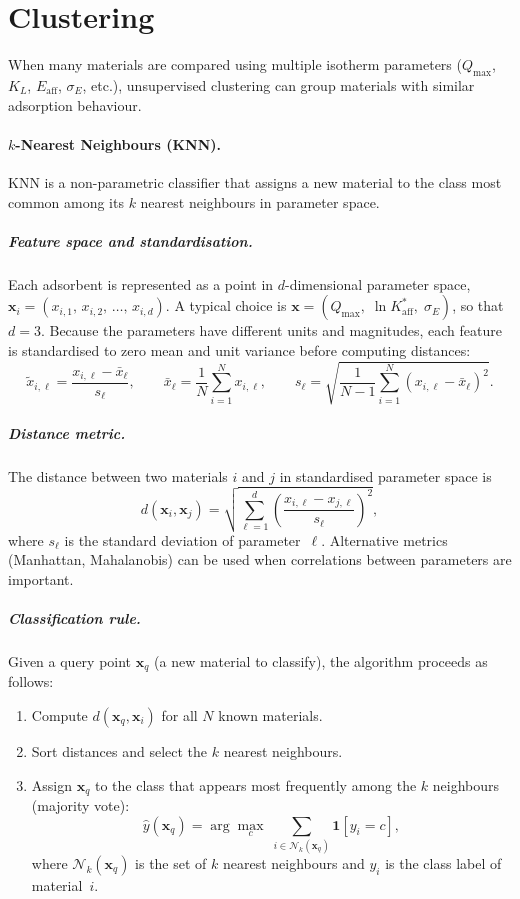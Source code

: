 \documentclass[12pt]{article}
\begin{document}
	\section{Clustering}

	When many materials are compared using multiple isotherm parameters
	($Q_{\max}$, $K_L$, $E_{\mathrm{aff}}$, $\sigma_E$, etc.),
	unsupervised clustering can group materials with similar adsorption
	behaviour.

	\paragraph{$k$-Nearest Neighbours (KNN).}
	KNN is a non-parametric classifier that assigns a new material to
	the class most common among its $k$ nearest neighbours in
	parameter space.

	\subparagraph{Feature space and standardisation.}
	Each adsorbent is represented as a point in $d$-dimensional
	parameter space,
	$\mathbf{x}_i = (x_{i,1},\, x_{i,2},\, \ldots,\, x_{i,d})$.
	A typical choice is
	$\mathbf{x} = (Q_{\max},\; \ln K_{\mathrm{aff}}^{\ast},\;
	\sigma_E)$, so that $d = 3$.
	Because the parameters have different units and magnitudes,
	each feature is standardised to zero mean and unit variance
	before computing distances:
	\begin{equation}
		\tilde{x}_{i,\ell}
		= \frac{x_{i,\ell} - \bar{x}_\ell}{s_\ell},
		\qquad
		\bar{x}_\ell = \frac{1}{N}\sum_{i=1}^{N} x_{i,\ell},
		\qquad
		s_\ell = \sqrt{\frac{1}{N-1}\sum_{i=1}^{N}
			(x_{i,\ell} - \bar{x}_\ell)^2}.
	\end{equation}

	\subparagraph{Distance metric.}
	The distance between two materials $i$ and $j$ in standardised
	parameter space is
	\begin{equation}
		d(\mathbf{x}_i, \mathbf{x}_j)
		= \sqrt{\sum_{\ell=1}^{d}
			\left(\frac{x_{i,\ell} - x_{j,\ell}}{s_\ell}\right)^{\!2}},
		\label{eq:KNN_distance}
	\end{equation}
	where $s_\ell$ is the standard deviation of parameter~$\ell$.
	Alternative metrics (Manhattan, Mahalanobis) can be used when
	correlations between parameters are important.

	\subparagraph{Classification rule.}
	Given a query point $\mathbf{x}_q$ (a new material to classify),
	the algorithm proceeds as follows:
	\begin{enumerate}
		\item Compute $d(\mathbf{x}_q, \mathbf{x}_i)$ for all $N$
		known materials.
		\item Sort distances and select the $k$ nearest neighbours.
		\item Assign $\mathbf{x}_q$ to the class that appears most
		frequently among the $k$ neighbours (majority vote):
		\begin{equation}
			\hat{y}(\mathbf{x}_q)
			= \arg\max_{c}\;
			\sum_{i \in \mathcal{N}_k(\mathbf{x}_q)}
			\mathbf{1}[y_i = c],
			\label{eq:KNN_vote}
		\end{equation}
		where $\mathcal{N}_k(\mathbf{x}_q)$ is the set of $k$
		nearest neighbours and $y_i$ is the class label of
		material~$i$.
	\end{enumerate}
\end{document}
